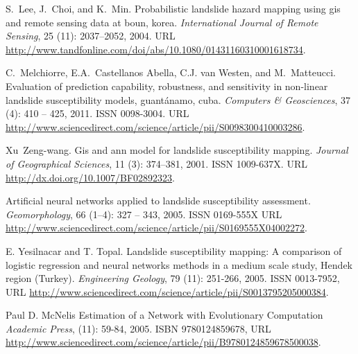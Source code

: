 \documentclass[11pt,twoside]{rmta2010esp}%
\begin{document}
\begin{thebibliography}{99}
S.~Lee, J.~Choi, and K.~Min.
\newblock Probabilistic landslide hazard mapping using gis and remote sensing
  data at boun, korea.
\newblock \emph{International Journal of Remote Sensing}, 25
  (11): 2037--2052, 2004.
\newblock URL
  \url{http://www.tandfonline.com/doi/abs/10.1080/01431160310001618734}.

C.~Melchiorre, E.A.~Castellanos Abella, C.J. van Westen, and M.~Matteucci.
\newblock Evaluation of prediction capability, robustness, and sensitivity in
  non-linear landslide susceptibility models, guantánamo, cuba.
\newblock \emph{Computers {\&} Geosciences}, 37 (4): 410 --
  425, 2011.
\newblock ISSN 0098-3004.
\newblock URL
  \url{http://www.sciencedirect.com/science/article/pii/S0098300410003286}.

Xu~Zeng-wang.
\newblock Gis and ann model for landslide susceptibility mapping.
\newblock \emph{Journal of Geographical Sciences}, 11 (3):
  374--381, 2001.
\newblock ISSN 1009-637X.
\newblock URL \url{http://dx.doi.org/10.1007/BF02892323}.


Artificial neural networks applied to landslide susceptibility assessment.
\newblock \emph{Geomorphology}, 66 (1–4): 327 -- 343, 2005.
\newblock ISSN 0169-555X
\newblock URL \url{http://www.sciencedirect.com/science/article/pii/S0169555X04002272}.



E. Yesilnacar and T. Topal.
\newblock Landslide susceptibility mapping: A comparison of logistic regression and neural networks methods in a medium scale study, Hendek region (Turkey).
\newblock \emph{Engineering Geology}, 79
  (11): 251-266, 2005.
\newblock ISSN 0013-7952,
\newblock URL
  \url{http://www.sciencedirect.com/science/article/pii/S0013795205000384}.


Paul D. McNelis
\newblock Estimation of a Network with Evolutionary Computation
\newblock \emph{Academic Press},
  (11): 59-84, 2005.
\newblock ISBN 9780124859678,
\newblock URL
  \url{http://www.sciencedirect.com/science/article/pii/B9780124859678500038}.




\end{thebibliography}
\end{document}
